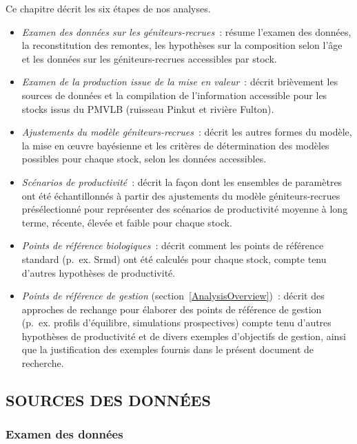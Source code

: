 \documentclass[french,11pt]{book}
\begin{document}
Ce chapitre décrit les six étapes de nos analyses.
\begin{itemize}

\item
  \emph{Examen des données sur les géniteurs-recrues}~: résume l'examen des données, la reconstitution des remontes, les hypothèses sur la composition selon l'âge et les données sur les géniteurs-recrues accessibles par stock.
\item
  \emph{Examen de la production issue de la mise en valeur}~: décrit brièvement les sources de données et la compilation de l'information accessible pour les stocks issus du PMVLB (ruisseau Pinkut et rivière Fulton).
\item
  \emph{Ajustements du modèle géniteurs-recrues}~: décrit les autres formes du modèle, la mise en œuvre bayésienne et les critères de détermination des modèles possibles pour chaque stock, selon les données accessibles.
\item
  \emph{Scénarios de productivité}~: décrit la façon dont les ensembles de paramètres ont été échantillonnés à partir des ajustements du modèle géniteurs-recrues présélectionné pour représenter des scénarios de productivité moyenne à long terme, récente, élevée et faible pour chaque stock.
\item
  \emph{Points de référence biologiques}~: décrit comment les points de référence standard (p.~ex. Srmd) ont été calculés pour chaque stock, compte tenu d'autres hypothèses de productivité.
\item
  \emph{Points de référence de gestion} (section~\ref{AnalysisOverview})~: décrit des approches de rechange pour élaborer des points de référence de gestion (p.~ex. profils d'équilibre, simulations prospectives) compte tenu d'autres hypothèses de productivité et de divers exemples d'objectifs de gestion, ainsi que la justification des exemples fournis dans le présent document de recherche.
\end{itemize}
\subsection{SOURCES DES DONNÉES}\label{DataSources}

\subsubsection{Examen des données}\label{DataReview}
\end{document}
